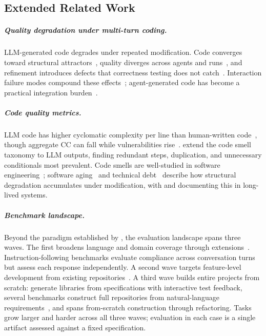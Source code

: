 \subsection{Extended Related Work}\label{sec:appendix-extended-related-work}

\subparagraph{Quality degradation under multi-turn coding.} LLM-generated code degrades under repeated modification. Code converges toward structural attractors~\citep{iterative-readability}, quality diverges across agents and runs~\citep{chen2025-patch-quality, santos2025-software-aging, bohr2025-show-and-tell}, and refinement introduces defects that correctness testing does not catch~\citep{scaffold-cegis, diff-fuzzing-refactoring}. Interaction failure modes compound these effects~\citep{interaction-smells, overcorrection-reviewers, more-rounds-more-noise}; agent-generated code has become a practical integration burden~\citep{nakashima2026-agentic-prs, vibe-coding-overhead}.

\subparagraph{Code quality metrics.} LLM code has higher cyclomatic complexity per line than human-written code~\citep{dou2024-whats-wrong-llm-code}, though aggregate CC can fall while vulnerabilities rise~\citep{cotroneo2025-human-vs-ai}. \citet{abbassi2025-taxonomy-inefficiencies} extend the code smell taxonomy to LLM outputs, finding redundant steps, duplication, and unnecessary conditionals most prevalent. Code smells are well-studied in software engineering~\citep{fowler1999-refactoring, lacerda2020-code-smells-tertiary}; software aging~\citep{parnas1994-software-aging} and technical debt~\citep{cunningham1992-technical-debt} describe how structural degradation accumulates under modification, with \citet{li2022-architecture-erosion} and \citet{le2021-architectural-decay} documenting this in long-lived systems.

\subparagraph{Benchmark landscape.} Beyond the paradigm established by \citet{swe-bench}, the evaluation landscape spans three waves. The first broadens language and domain coverage through extensions~\citep{swe-bench-plus, multi-swe-bench, rust-swe-bench, swe-rebench-v2, swe-polybench}. Instruction-following benchmarks evaluate compliance across conversation turns~\citep{codeif-bench, multicodeif} but assess each response independently. A second wave targets feature-level development from existing repositories~\citep{fea-bench, featurebench}. A third wave builds entire projects from scratch: \citet{commit0} generate libraries from specifications with interactive test feedback, several benchmarks construct full repositories from natural-language requirements~\citep{projdevbench, e2edevbench, nl2repo-bench, swe-agi, projecteval}, and \citet{longcli-bench} spans from-scratch construction through refactoring. Tasks grow larger and harder across all three waves; evaluation in each case is a single artifact assessed against a fixed specification.
